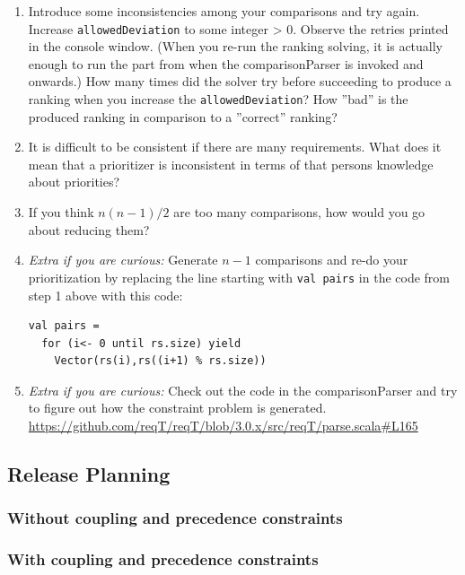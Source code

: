\documentclass[11pt]{article}
\begin{document}
\begin{framed}
\begin{enumerate}
\item Introduce some inconsistencies among your comparisons and try again. Increase \verb+allowedDeviation+ to some integer > 0. Observe the retries printed in the console window. (When you re-run the ranking solving, it is actually enough to run the part from when the comparisonParser is invoked and onwards.) How many times did the solver try before succeeding to produce a ranking when you increase the \verb+allowedDeviation+? How ''bad'' is the produced ranking in comparison to a ''correct'' ranking?
\vspace{6em}
\item It is difficult to be consistent if there are many requirements. What does it mean that a prioritizer is inconsistent in terms of that persons knowledge about priorities?
\vspace{4em}
\item If you think $n(n-1)/2$ are too many comparisons, how would you go about reducing them?
 \vspace{4em}
\item {\it Extra if you are curious:} Generate $n-1$ comparisons and re-do your prioritization by replacing the line starting with \verb+val pairs+ in the code from step 1 above with this code:
\begin{lstlisting}
val pairs = 
  for (i<- 0 until rs.size) yield 
    Vector(rs(i),rs((i+1) % rs.size))
\end{lstlisting}
\item {\it Extra if you are curious:} Check out the code in the comparisonParser and try to figure out how the constraint problem is generated. \url{https://github.com/reqT/reqT/blob/3.0.x/src/reqT/parse.scala#L165} 
\end{enumerate}

\end{framed}


\clearpage\newpage 

\subsection{Release Planning}
\blindtext
\subsubsection{Without coupling and precedence constraints}
\blindtext
\subsubsection{With coupling and precedence constraints}
\blindtext
\end{document}
